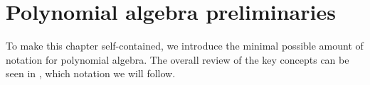 \section{Polynomial algebra preliminaries}
To make this chapter self-contained, we introduce the minimal possible amount of notation for polynomial algebra.
The overall review of the key concepts can be seen in \cite{Cox-Little-Shea2015}, which notation we will follow.
